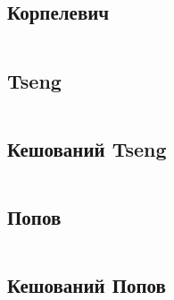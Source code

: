 \newpage

\subsection{Корпелевич}
\inputminted[linenos,fontsize=\tiny]{python}{src/korpelevich.py}
\newpage

\subsection{Tseng}
\inputminted[linenos,fontsize=\tiny]{python}{src/tseng.py}
\newpage

\subsection{Кешований Tseng}
\inputminted[linenos,fontsize=\tiny]{python}{src/cached_tseng.py}
\newpage

\subsection{Попов}
\inputminted[linenos,fontsize=\tiny]{python}{src/popov.py}
\newpage

\subsection{Кешований Попов}
\inputminted[linenos,fontsize=\tiny]{python}{src/cached_popov.py}
